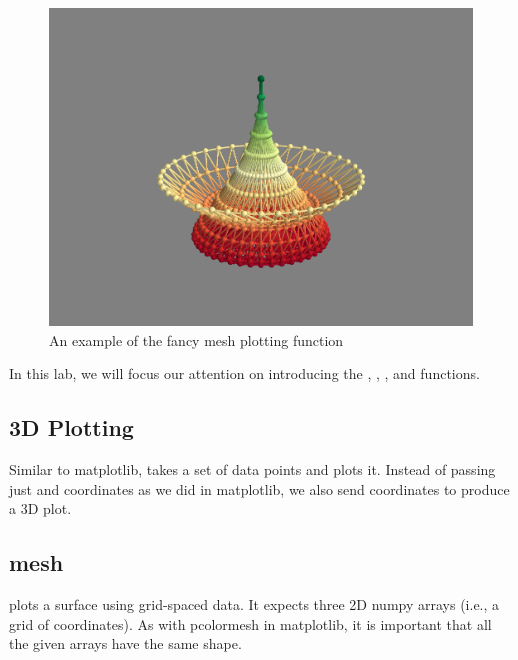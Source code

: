 \begin{figure} 
\includegraphics[width=\textwidth]{fancymesh.png}
\caption{An example of the fancy mesh plotting function} 
\label{fig:fancymesh}
\end{figure}


In this lab, we will focus our attention on introducing the , , 
, and  functions. 


\subsection*{3D Plotting} Similar to matplotlib,  takes a set
of data points and plots it. Instead of passing just  and 
coordinates as we did in matplotlib, we also send 
coordinates to produce a 3D plot. 

\subsection*{mesh}
 plots a surface using grid-spaced data. 
It expects three 2D numpy arrays (i.e., a grid of  coordinates). As with pcolormesh in matplotlib, it is important that 
all the given arrays have the same shape. 

